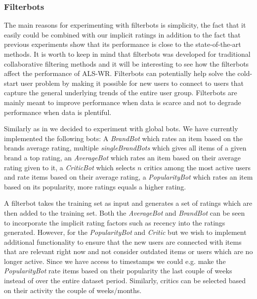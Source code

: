 \subsubsection{Filterbots}

The main reasons for experimenting with filterbots is simplicity, the fact that it easily could
be combined with our implicit ratings in addition to the fact that previous experiments \cite{Agarwal2009, Agarwal2010}
show that its performance is close to the state-of-the-art methods. It is worth to keep in mind that filterbots was
developed for traditional collaborative filtering methods and it will be interesting to see how the filterbots affect
the performance of ALS-WR. Filterbots can potentially help solve the cold-start user problem by making it possible for
new users to connect to users that capture the general underlying trends of the entire user group. Filterbots are mainly
meant to improve performance when data is scarce and not to degrade performance when data is plentiful.

Similarly as in \cite{Park2006} we decided to experiment with global bots. We have currently implemented the
following bots: A \emph{BrandBot} which rates an item based on the brands average rating, 
multiple \emph{singleBrandBots} which gives all items of a given brand a top rating,
an \emph{AverageBot} which rates an item based on their average rating given to it, a \emph{CriticBot} which selects $n$ critics
among the most active users and rate items based on their average rating, a \emph{PopularityBot} which rates
an item based on its popularity, more ratings equals a higher rating.

A filterbot takes the training set as input and generates a set of ratings which are then added to the training set. Both the \emph{AverageBot} and \emph{BrandBot} can be seen to incorporate the implicit rating factors such as recency into the ratings generated. However, for the \emph{PopularityBot} and \emph{Critic} but we wish to implement additional functionality to ensure
that the new users are connected with items that are relevant right now and not consider outdated items or users which
are no longer active. Since we have access to timestamps we could e.g. make the \emph{PopularityBot} rate items based on
their popularity the last couple of weeks instead of over the entire dataset period. Similarly, critics can be selected
based on their activity the couple of weeks/months.


